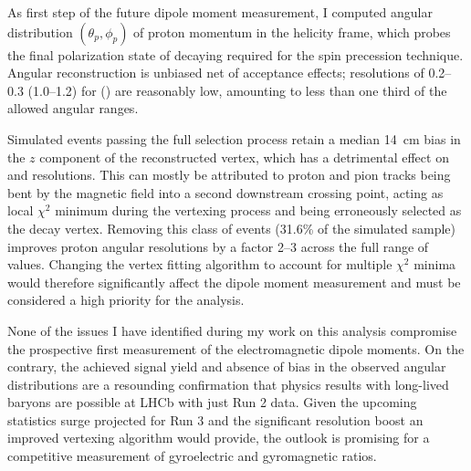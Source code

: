 As first step of the future \lz dipole moment measurement, I computed angular distribution $(\theta_p, \phi_p)$ of proton momentum in the \lz helicity frame, which probes the final polarization state of decaying \lz required for the spin precession technique.
Angular reconstruction is unbiased net of acceptance effects;
resolutions of 0.2--0.3 (1.0--1.2) for \cthetap (\phip) are reasonably low, amounting to less than one third of the allowed angular ranges.

Simulated \demonstratorshort events passing the full selection process retain a median \SI{14}{\centi\meter} bias in the $z$ component of the reconstructed \lambdadecay vertex, which has a detrimental effect on \cthetap and \phip resolutions.
This can mostly be attributed to proton and pion tracks being bent by the magnetic field into a second downstream crossing point, acting as local $\chi^2$ minimum during the vertexing process and being erroneously selected as the \lz decay vertex.
Removing this class of events (31.6\% of the simulated sample) improves proton angular resolutions by a factor 2--3 across the full range of values.
Changing the vertex fitting algorithm to account for multiple $\chi^2$ minima would therefore significantly affect the dipole moment measurement and must be considered a high priority for the analysis.

None of the issues I have identified during my work on this analysis compromise the prospective first measurement of the \lz electromagnetic dipole moments.
On the contrary, the achieved signal yield and absence of bias in the observed angular distributions are a resounding confirmation that physics results with long-lived \lz baryons are possible at LHCb with just Run 2 data.
Given the upcoming statistics surge projected for Run 3 and the significant resolution boost an improved vertexing algorithm would provide, the outlook is promising for a competitive measurement of \lz gyroelectric and gyromagnetic ratios.